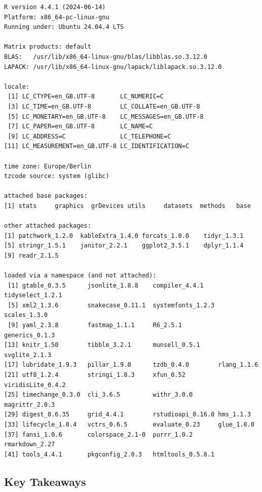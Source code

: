 \documentclass[
  letterpaper,
  DIV=11,
  numbers=noendperiod]{scrartcl}
\begin{document}
\begin{verbatim}
R version 4.4.1 (2024-06-14)
Platform: x86_64-pc-linux-gnu
Running under: Ubuntu 24.04.4 LTS

Matrix products: default
BLAS:   /usr/lib/x86_64-linux-gnu/blas/libblas.so.3.12.0 
LAPACK: /usr/lib/x86_64-linux-gnu/lapack/liblapack.so.3.12.0

locale:
 [1] LC_CTYPE=en_GB.UTF-8       LC_NUMERIC=C              
 [3] LC_TIME=en_GB.UTF-8        LC_COLLATE=en_GB.UTF-8    
 [5] LC_MONETARY=en_GB.UTF-8    LC_MESSAGES=en_GB.UTF-8   
 [7] LC_PAPER=en_GB.UTF-8       LC_NAME=C                 
 [9] LC_ADDRESS=C               LC_TELEPHONE=C            
[11] LC_MEASUREMENT=en_GB.UTF-8 LC_IDENTIFICATION=C       

time zone: Europe/Berlin
tzcode source: system (glibc)

attached base packages:
[1] stats     graphics  grDevices utils     datasets  methods   base     

other attached packages:
[1] patchwork_1.2.0  kableExtra_1.4.0 forcats_1.0.0    tidyr_1.3.1     
[5] stringr_1.5.1    janitor_2.2.1    ggplot2_3.5.1    dplyr_1.1.4     
[9] readr_2.1.5     

loaded via a namespace (and not attached):
 [1] gtable_0.3.5      jsonlite_1.8.8    compiler_4.4.1    tidyselect_1.2.1 
 [5] xml2_1.3.6        snakecase_0.11.1  systemfonts_1.2.3 scales_1.3.0     
 [9] yaml_2.3.8        fastmap_1.1.1     R6_2.5.1          generics_0.1.3   
[13] knitr_1.50        tibble_3.2.1      munsell_0.5.1     svglite_2.1.3    
[17] lubridate_1.9.3   pillar_1.9.0      tzdb_0.4.0        rlang_1.1.6      
[21] utf8_1.2.4        stringi_1.8.3     xfun_0.52         viridisLite_0.4.2
[25] timechange_0.3.0  cli_3.6.5         withr_3.0.0       magrittr_2.0.3   
[29] digest_0.6.35     grid_4.4.1        rstudioapi_0.16.0 hms_1.1.3        
[33] lifecycle_1.0.4   vctrs_0.6.5       evaluate_0.23     glue_1.8.0       
[37] fansi_1.0.6       colorspace_2.1-0  purrr_1.0.2       rmarkdown_2.27   
[41] tools_4.4.1       pkgconfig_2.0.3   htmltools_0.5.8.1
\end{verbatim}

\subsection{Key Takeaways}\label{key-takeaways}
\end{document}
